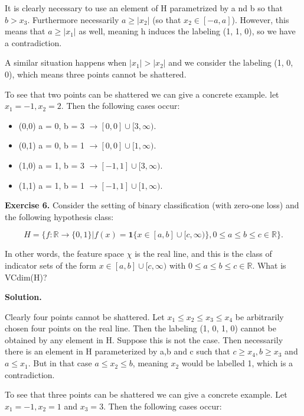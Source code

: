 \documentclass{article}
\newcommand{\<}{\langle}
\renewcommand{\>}{\rangle}
\theoremstyle{definition}
\begin{document}
It is clearly necessary to use an element of H parametrized by a nd b so that $b > x_3$. Furthermore necessarily $a \geq |x_2|$ (so that $x_2 \in [-a, a]$). However, this means that $a \geq |x_1|$ as well, meaning h induces the labeling (1, 1, 0), so we have a contradiction.

A similar situation happens when $|x_1| > |x_2|$ and we consider the labeling (1, 0, 0), which means three points cannot be shattered. 

To see that two points can be shattered we can give a concrete example. let $x_1 = -1, x_2 = 2$. Then the following cases occur:

\begin{itemize}
    \item[] (0,0) a = 0, b = 3 $\rightarrow [0, 0] \cup [3, \infty)$.
    \item[] (0,1) a = 0, b = 1 $\rightarrow [0, 0] \cup [1, \infty)$.
    \item[] (1,0) a = 1, b = 3 $\rightarrow [-1, 1] \cup [3, \infty)$.
    \item[] (1,1) a = 1, b = 1 $\rightarrow [-1, 1] \cup [1, \infty)$.
\end{itemize}

\textbf{Exercise 6.} Consider the setting of binary classification (with zero-one loss) and the following hypothesis class:

\vspace{-5mm}

$$H = \{f : \mathbb{R} \rightarrow \{0,1\} | f(x) = \textbf{1}\{x \in [a, b] \cup [c, \infty)\}, 0 \leq a \leq b \leq c \in \mathbb{R} \}.$$

In other words, the feature space $\chi$ is the real line, and this is the class of indicator sets of the form $x \in [a, b] \cup [c, \infty)$ with $0 \leq a \leq b \leq c \in \mathbb{R}$. What is VCdim(H)?

\textbf{Solution.}

Clearly four points cannot be shattered. Let $x_1 \leq x_2 \leq x_3 \leq x_4$ be arbitrarily chosen four points on the real line. Then the labeling (1, 0, 1, 0) cannot be obtained by any element in H. Suppose this is not the case. Then necessarily there is an element in H parameterized by a,b and c such that $c \geq x_4, b \geq x_3$ and $a \leq x_1$. But in that case $a \leq x_2 \leq b$, meaning $x_2$ would be labelled 1, which is a contradiction.

To see that three points can be shattered we can give a concrete example. Let $x_1 = -1, x_2 = 1$ and $x_3 = 3$. Then the following cases occur:
\end{document}
